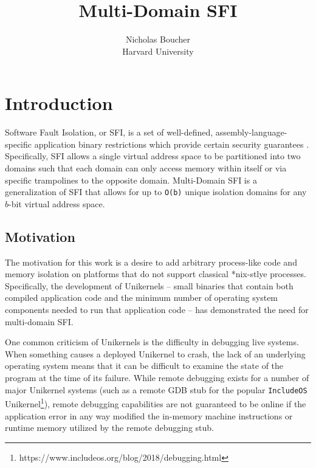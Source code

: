 \documentclass[12pt]{IEEEtran}
\begin{document}
 
\title{Multi-Domain SFI}
\author{Nicholas Boucher \\ Harvard University}

\maketitle

\section{Introduction}

Software Fault Isolation, or SFI, is a set of well-defined, assembly-language-specific application binary restrictions which provide certain security guarantees \cite{wahbe_efficient_1993}. Specifically, SFI allows a single virtual address space to be partitioned into two domains such that each domain can only access memory within itself or via specific trampolines to the opposite domain. Multi-Domain SFI is a generalization of SFI that allows for up to \texttt{O(b)} unique isolation domains for any $b$-bit virtual address space.

\subsection{Motivation}

The motivation for this work is a desire to add arbitrary process-like code and memory isolation on platforms that do not support classical *nix-stlye processes. Specifically, the development of Unikernels -- small binaries that contain both compiled application code and the minimum number of operating system components needed to run that application code \cite{madhavapeddy_unikernels:_2013} -- has demonstrated the need for multi-domain SFI.

One common criticism of Unikernels is the difficulty in debugging live systems. When something causes a deployed Unikernel to crash, the lack of an underlying operating system means that it can be difficult to examine the state of the program at the time of its failure. While remote debugging exists for a number of major Unikernel systems (such as a remote GDB stub for the popular \texttt{IncludeOS} \cite{a._bratterud_includeos:_2015} Unikernel\footnote{https://www.includeos.org/blog/2018/debugging.html}), remote debugging capabilities are not guaranteed to be online if the application error in any way modified the in-memory machine instructions or runtime memory utilized by the remote debugging stub.
\end{document}
